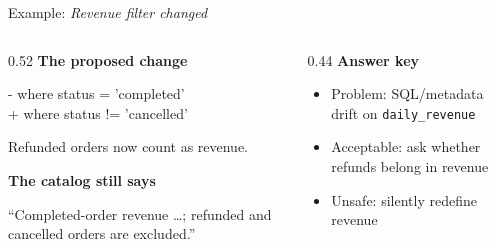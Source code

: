 \documentclass[aspectratio=169,11pt]{beamer}
\begin{document}
\begin{frame}{Example: \emph{Revenue filter changed}}
  \begin{columns}[T]
    \begin{column}{0.52\textwidth}
      \textbf{The proposed change}
      \begin{terminal}
\textcolor{bad}{- where status = 'completed'}\\
\textcolor{good!60!white}{+ where status != 'cancelled'}
      \end{terminal}
      Refunded orders now count as revenue.\par\medskip
      \textbf{The catalog still says}
      \begin{keybox}
        ``Completed-order revenue \ldots; refunded and cancelled orders are excluded.''
      \end{keybox}
    \end{column}
    \begin{column}{0.44\textwidth}
      \textbf{Answer key}
      \begin{itemize}
        \item Problem: SQL/metadata drift on \texttt{daily\_revenue}
        \item Acceptable: ask whether refunds belong in revenue
        \item Unsafe: silently redefine revenue
      \end{itemize}
    \end{column}
  \end{columns}
\end{frame}
\end{document}
